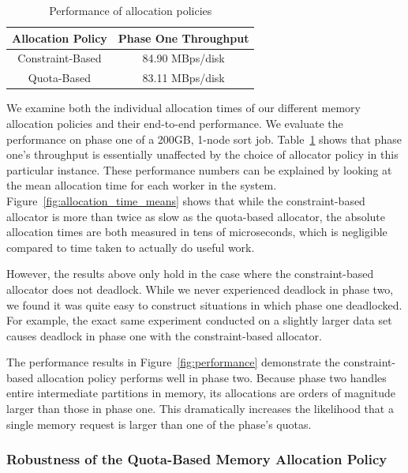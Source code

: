 \begin{table}
  \centering
  \caption{\label{table:allocator_end_to_end_performance} Performance of
    allocation policies}
  \begin{tabular}{|c|c|}
    \hline
    \textbf{Allocation Policy} & \textbf{Phase One Throughput} \\
    \hline
    Constraint-Based & 84.90 MBps/disk \\
    Quota-Based & 83.11 MBps/disk \\
    \hline
  \end{tabular}
\end{table}

We examine both the individual allocation times of our different memory
allocation policies and their end-to-end performance.  We evaluate the
performance on phase one of a 200GB, 1-node sort
job. Table~\ref{table:allocator_end_to_end_performance} shows that phase one's
throughput is essentially unaffected by the choice of allocator policy in this
particular instance. These performance numbers can be explained by looking at
the mean allocation time for each worker in the
system. Figure~\ref{fig:allocation_time_means} shows that while the
constraint-based allocator is more than twice as slow as the quota-based
allocator, the absolute allocation times are both measured in tens of
microseconds, which is negligible compared to time taken to actually do useful
work.

However, the results above only hold in the case where the constraint-based
allocator does not deadlock. While we never experienced deadlock in phase two,
we found it was quite easy to construct situations in which phase one
deadlocked. For example, the exact same experiment conducted on a slightly
larger data set causes deadlock in phase one with the constraint-based
allocator.

The performance results in Figure~\ref{fig:performance} demonstrate the
constraint-based allocation policy performs well in phase two.  Because phase
two handles entire intermediate partitions in memory, its allocations are
orders of magnitude larger than those in phase one. This dramatically increases
the likelihood that a single memory request is larger than one of the phase's
quotas.

\subsubsection{Robustness of the Quota-Based Memory Allocation Policy}

